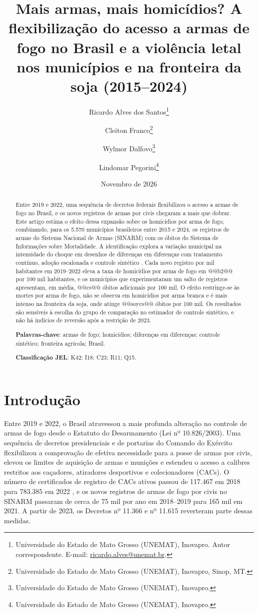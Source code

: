 \documentclass[11pt,a4paper]{article}
\title{\textbf{Mais armas, mais homicídios? A flexibilização do acesso a armas de fogo no Brasil e a violência letal nos municípios e na fronteira da soja (2015--2024)}}
\author{Ricardo Alves dos Santos\thanks{Universidade do Estado de Mato Grosso (UNEMAT), Inovapro. Autor correspondente. E-mail: \href{mailto:ricardo.alves@unemat.br}{ricardo.alves@unemat.br}.}
\and Cleiton Franco\thanks{Universidade do Estado de Mato Grosso (UNEMAT), Inovapro, Sinop, MT.}
\and Wylmor Dalfovo\thanks{Universidade do Estado de Mato Grosso (UNEMAT), Inovapro.}
\and Lindomar Pegorini\thanks{Universidade do Estado de Mato Grosso (UNEMAT), Inovapro.}}
\date{Novembro de 2026}
\begin{document}
\maketitle
\thispagestyle{empty}

\begin{abstract}
\noindent Entre 2019 e 2022, uma sequência de decretos federais flexibilizou o acesso a armas de fogo no Brasil, e os novos registros de armas por civis chegaram a mais que dobrar. Este artigo estima o efeito dessa expansão sobre os homicídios por arma de fogo, combinando, para os 5.570 municípios brasileiros entre 2015 e 2024, os registros de armas do Sistema Nacional de Armas (SINARM) com os óbitos do Sistema de Informações sobre Mortalidade. A identificação explora a variação municipal na intensidade do choque em desenhos de diferenças em diferenças com tratamento contínuo, adoção escalonada \citep{callaway2021} e controle sintético \citep{arkhangelsky2021}. Cada novo registro por mil habitantes em 2019--2022 eleva a taxa de homicídios por arma de fogo em @@b2@@ por 100 mil habitantes, e os municípios que experimentaram um salto de registros apresentam, em média, @@cs@@ óbitos adicionais por 100 mil. O efeito restringe-se às mortes por arma de fogo, não se observa em homicídios por arma branca e é mais intenso na fronteira da soja, onde atinge @@soycs@@ óbitos por 100 mil. Os resultados são sensíveis à escolha do grupo de comparação no estimador de controle sintético, e não há indícios de reversão após a restrição de 2023.

\vspace{0.6em}
\noindent\textbf{Palavras-chave}: armas de fogo; homicídios; diferenças em diferenças; controle sintético; fronteira agrícola; Brasil.

\noindent\textbf{Classificação JEL}: K42; I18; C23; R11; Q15.
\end{abstract}

\newpage
\setcounter{page}{1}

\section{Introdução}

Entre 2019 e 2022, o Brasil atravessou a mais profunda alteração no controle de armas de fogo desde o Estatuto do Desarmamento (Lei nº 10.826/2003). Uma sequência de decretos presidenciais e de portarias do Comando do Exército flexibilizou a comprovação de efetiva necessidade para a posse de armas por civis, elevou os limites de aquisição de armas e munições e estendeu o acesso a calibres restritos aos caçadores, atiradores desportivos e colecionadores (CACs). O número de certificados de registro de CACs ativos passou de 117.467 em 2018 para 783.385 em 2022 \citep{fbsp2023}, e os novos registros de armas de fogo por civis no SINARM passaram de cerca de 75 mil por ano em 2018--2019 para 165 mil em 2021. A partir de 2023, os Decretos nº 11.366 e nº 11.615 reverteram parte dessas medidas.
\end{document}
